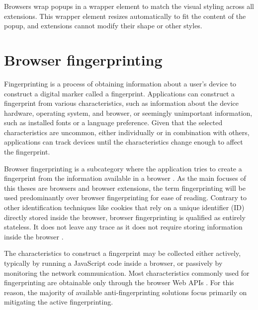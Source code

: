 Browsers wrap popups in a wrapper element to match the visual styling across all extensions. This wrapper element resizes automatically to fit the content of the popup, and extensions cannot modify their shape or other styles.




\chapter{Browser fingerprinting}
\label{Chapter:BrowserFingerprinting}

Fingerprinting is a process of obtaining information about a user's device to construct a digital marker called a fingerprint. Applications can construct a fingerprint from various characteristics, such as information about the device hardware, operating system, and browser, or seemingly unimportant information, such as installed fonts or a language preference. Given that the selected characteristics are uncommon, either individually or in combination with others, applications can track devices until the characteristics change enough to affect the fingerprint.

Browser fingerprinting is a subcategory where the application tries to create a fingerprint from the information available in a browser \cite{FingerprintingSurvey}. As the main focuses of this theses are browsers and browser extensions, the term fingerprinting will be used predominantly over browser fingerprinting for ease of reading. Contrary to other identification techniques like cookies that rely on a unique identifier (ID) directly stored inside the browser, browser fingerprinting is qualified as entirely stateless. It does not leave any trace as it does not require storing information inside the browser \cite{FingerprintingSurvey}.

The characteristics to construct a fingerprint may be collected either actively, typically by running a JavaScript code inside a browser, or passively by monitoring the network communication. Most characteristics commonly used for fingerprinting are obtainable only through the browser Web APIs \cite{VondracekDP}. For this reason, the majority of available anti-fingerprinting solutions focus primarily on mitigating the active fingerprinting.

